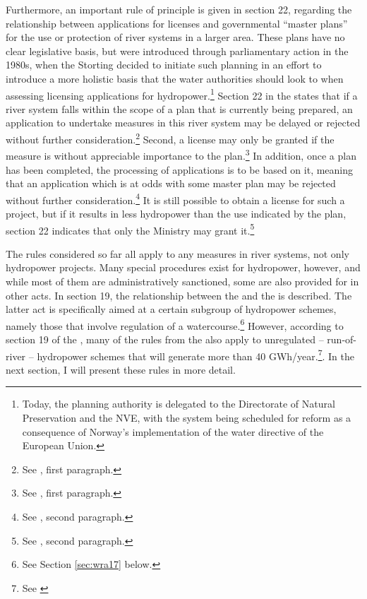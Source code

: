 Furthermore, an important rule of principle is given in section 22, regarding the relationship between applications for licenses and governmental ``master plans'' for the use or protection of river systems in a larger area. These plans have no clear legislative basis, but were introduced through parliamentary action in the 1980s, when the Storting decided to initiate such planning in an effort to introduce a more holistic basis that the water authorities should look to when assessing licensing applications for hydropower.\footnote{Today, the planning authority is delegated to the Directorate of Natural Preservation and the NVE, with the system being scheduled for reform as a consequence of Norway's implementation of the water directive of the European Union.} Section 22 in the \cite{wra00} states that if a river system falls within the scope of a plan that is currently being prepared, an application to undertake measures in this river system may be delayed or rejected without further consideration.\footnote{See \cite[22]{wra00}, first paragraph.} Second, a license may only be granted if the measure is without appreciable importance to the plan.\footnote{See \cite[22]{wra00}, first paragraph.} In addition, once a plan has been completed, the processing of applications is to be based on it, meaning that an application which is at odds with some master plan may be rejected without further consideration.\footnote{See \cite[22]{wra00}, second paragraph.} It is still possible to obtain a license for such a project, but if it results in less hydropower than the use indicated by the plan, section 22 indicates that only the Ministry may grant it.\footnote{See \cite[22]{wra00}, second paragraph.}

The rules considered so far all apply to any measures in river systems, not only hydropower projects. Many special procedures exist for hydropower, however, and while most of them are administratively sanctioned, some are also provided for in other acts. In section 19, the relationship between the \cite{wra00} and the \cite{wra00} is described. The latter act is specifically aimed at a certain subgroup of hydropower schemes, namely those that involve regulation of a watercourse.\footnote{See Section \ref{sec:wra17} below.} However, according to section 19 of the \cite{wra00}, many of the rules from the \cite{wra17} also apply to unregulated -- run-of-river -- hydropower schemes that will generate more than 40 GWh/year.\footnote{See \cite[19]{wra00}}. In the next section, I will present these rules in more detail.

